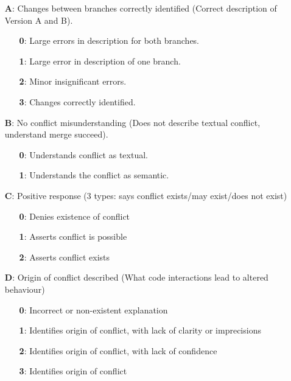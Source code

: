 \begin{itemize}
  \item[\textbf{A}:] Changes between branches correctly identified (Correct description of Version A and B).
  \begin{itemize}
    \item[\textbf{0}:] Large errors in description for both branches.
    \item[\textbf{1}:] Large error in description of one branch.
    \item[\textbf{2}:] Minor insignificant errors.
    \item[\textbf{3}:] Changes correctly identified.
  \end{itemize}

  \item[\textbf{B}:] No conflict misunderstanding (Does not describe textual conflict, understand merge succeed).
  \begin{itemize}
    \item[\textbf{0}:] Understands conflict as textual.
    \item[\textbf{1}:] Understands the conflict as semantic.
  \end{itemize}

  \item[\textbf{C}:] Positive response (3 types: says conflict exists/may exist/does not exist)
  \begin{itemize}
    \item[\textbf{0}:] Denies existence of conflict
    \item[\textbf{1}:] Asserts conflict is possible
    \item[\textbf{2}:] Asserts conflict exists
  \end{itemize}

  \item[\textbf{D}:] Origin of conflict described (What code interactions lead to altered behaviour)
  \begin{itemize}
    \item[\textbf{0}:] Incorrect or non-existent explanation
    \item[\textbf{1}:] Identifies origin of conflict, with lack of clarity or imprecisions
    \item[\textbf{2}:] Identifies origin of conflict, with lack of confidence
    \item[\textbf{3}:] Identifies origin of conflict
  \end{itemize}


\end{itemize}

